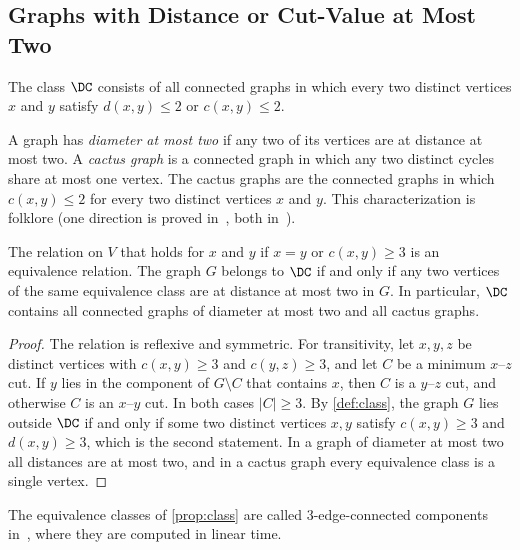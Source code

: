 \subsection{Graphs with Distance or Cut-Value at Most Two}
\label{sec:class}

\begin{definition}
\label{def:class}
The class $\DC$ consists of all connected graphs in which every two distinct vertices $x$ and $y$ satisfy $d(x, y) \leq 2$ or $c(x, y) \leq 2$.
\end{definition}

A graph has \emph{diameter at most two} if any two of its vertices are at distance at most two.
A \emph{cactus graph} is a connected graph in which any two distinct cycles share at most one vertex.
The cactus graphs are the connected graphs in which $c(x, y) \leq 2$ for every two distinct vertices $x$ and $y$.
This characterization is folklore (one direction is proved in~\cite[Claim~17]{Michel2025MinCutPath}, both in~\cite[Lemma~6.1]{Michel2026MinCutPath}).

\begin{proposition}
\label{prop:class}
The relation on $V$ that holds for $x$ and $y$ if $x = y$ or $c(x, y) \geq 3$ is an equivalence relation.
The graph $G$ belongs to $\DC$ if and only if any two vertices of the same equivalence class are at distance at most two in $G$.
In particular, $\DC$ contains all connected graphs of diameter at most two and all cactus graphs.
\end{proposition}

\begin{proof}
The relation is reflexive and symmetric.
For transitivity, let $x, y, z$ be distinct vertices with $c(x, y) \geq 3$ and $c(y, z) \geq 3$, and let $C$ be a minimum $x$--$z$ cut.
If $y$ lies in the component of $G \setminus C$ that contains $x$, then $C$ is a $y$--$z$ cut, and otherwise $C$ is an $x$--$y$ cut.
In both cases $|C| \geq 3$.
By \cref{def:class}, the graph $G$ lies outside $\DC$ if and only if some two distinct vertices $x, y$ satisfy $c(x, y) \geq 3$ and $d(x, y) \geq 3$, which is the second statement.
In a graph of diameter at most two all distances are at most two, and in a cactus graph every equivalence class is a single vertex.
\end{proof}

The equivalence classes of \cref{prop:class} are called 3-edge-connected components in~\cite{Mehlhorn2017Certifying}, where they are computed in linear time.

